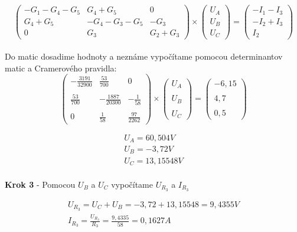 \begin{equation*}
\begin{pmatrix}
-G_1 - G_4 - G_5 & G_4 + G_5 & 0 \\
G_4 + G_5 & -G_4 - G_3 - G_5 & -G_3 \\
0 & G_3 & G_2 + G_3 
\end{pmatrix}
\times
\begin{pmatrix}
U_A \\
U_B \\
U_C 
\end{pmatrix}
=
\begin{pmatrix}
-I_1 - I_3 \\
-I_2 + I_3 \\
I_2
\end{pmatrix}
\end{equation*}
\\

Do matic dosadime hodnoty a neznáme vypočítame pomocou determinantov matic a Cramerového pravidla: \\

\begin{equation*}
\begin{pmatrix}
- \frac {3191} {32900} & \frac {53} {700} & 0 \\\\
 \frac {53} {700} & - \frac {1887} {20300} & - \frac {1}{58} \\\\
0 &\frac {1}{58} & \frac {97} {2262} 
\end{pmatrix}
\times
\begin{pmatrix}
U_A \\\\
U_B \\\\
U_C 
\end{pmatrix}
=
\begin{pmatrix}
-6,15 \\\\
4,7 \\\\
0,5
\end{pmatrix}
\end{equation*}

\begin{gather*}
U_A = 60,504 V \\
 U_B = -3,72 V \\
U_C = 13,15548 V \\
\end{gather*}

\begin{center}
    \textbf{Krok 3} - Pomocou $U_{B}$ a $U_{C}$ vypočítame $U_{R_{3}}$ a $I_{R_{3}}$ 
\end{center}

\begin{gather*}
    U_{R_{3}} = U_C +  U_B = -3,72 + 13,15548 = 9,4355 V \\
    I_{R_{3}} = \frac {U_{R_{3}}} {R_3} = \frac {9,4335} {58} = 0,1627 A
\end{gather*}


